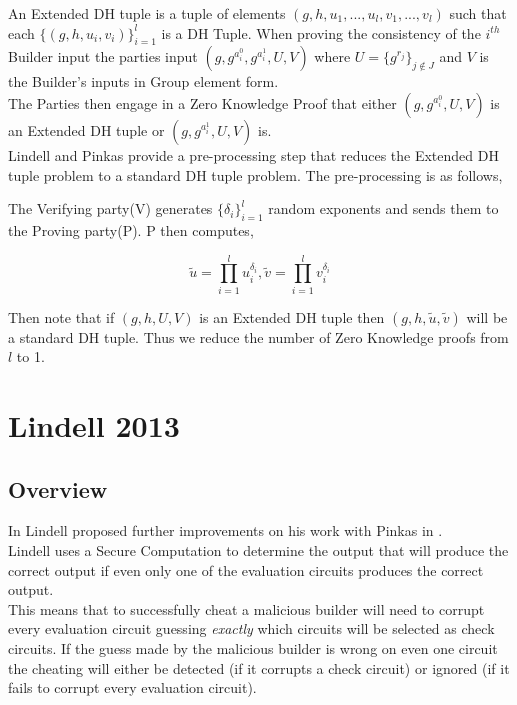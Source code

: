 \documentclass[ %
                    author={Nicholas Tutte},
                supervisor={Prof. Nigel Smart},
                    degree={MEng},
                     title={Secure Two Party Computation},
                  subtitle={A practical comparison of recent protocols},
                      type={Research - GG1K},
                      year={2015} ]{dissertation}
\begin{document}
					An Extended DH tuple is a tuple of elements $(g, h, u_1, ..., u_l, v_1, ..., v_l)$ such that each $\{(g, h, u_i, v_i)\}_{i = 1}^{l}$ is a DH Tuple. When proving the consistency of the $i^{th}$ Builder input the parties input $(g, g^{a_i^0}, g^{a_i^1}, U, V)$ where $U = \{g^{r_j}\}_{j \notin J}$ and $V$ is the Builder's inputs in Group element form.\\

					The Parties then engage in a Zero Knowledge Proof that either $(g, g^{a_i^0}, U, V)$ is an Extended DH tuple or $(g, g^{a_i^1}, U, V)$ is.\\

					Lindell and Pinkas provide a pre-processing step that reduces the Extended DH tuple problem to a standard DH tuple problem. The pre-processing is as follows,

					The Verifying party(V) generates $\{\delta_i\}_{i = 1}^{l}$ random exponents and sends them to the Proving party(P). P then computes,
					
					$$\tilde u = \prod^{l}_{i = 1} u_i^{\delta_i}, \tilde v = \prod^{l}_{i = 1} v_i^{\delta_i}$$

					Then note that if $(g, h, U, V)$ is an Extended DH tuple then $(g, h, \tilde u, \tilde v)$ will be a standard DH tuple. Thus we reduce the number of Zero Knowledge proofs from $l$ to 1.

		\section{Lindell 2013}
			\subsection{Overview}

				In \cite{Lindell_CnC_2013} Lindell proposed further improvements on his work with Pinkas in \cite{LindellAndPinkas2011}.\\

				Lindell uses a Secure Computation to determine the output that will produce the correct output if even only one of the evaluation circuits produces the correct output.\\

				This means that to successfully cheat a malicious builder will need to corrupt every evaluation circuit guessing \emph{exactly} which circuits will be selected as check circuits. If the guess made by the malicious builder is wrong on even one circuit the cheating will either be detected (if it corrupts a check circuit) or ignored (if it fails to corrupt every evaluation circuit).\\
\end{document}
